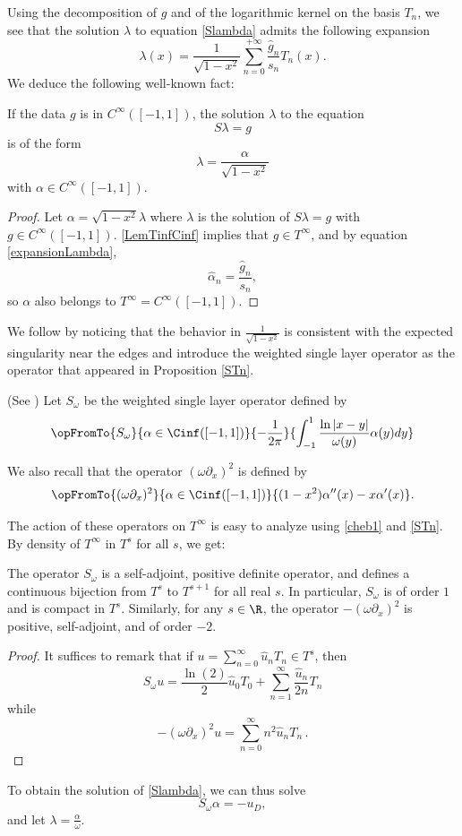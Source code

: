 \documentclass[a4paper]{article}
\begin{document}
	Using the decomposition of $g$ and of the logarithmic kernel on the basis $T_n$, we see that the solution $\lambda$ to equation \eqref{Slambda} admits the following expansion 
	\begin{equation}
	\lambda(x) = \frac{1}{\sqrt{1-x^2}}\sum_{n=0}^{+ \infty} \frac{\hat{g}_n}{s_n} T_n(x).
	\label{expansionLambda}
	\end{equation}
	We deduce the following well-known fact:
	\begin{Cor}
		\label{CorSingularity}
		If the data $g$ is in $C^{\infty}([-1,1])$, the solution $\lambda$ to the equation 
		\[S\lambda = g\]
		is of the form 
		\[\lambda = \dfrac{\alpha}{\sqrt{1-x^2}}\]
		with $\alpha \in C^{\infty}([-1,1])$.  
		\begin{proof}
			Let $\alpha = \sqrt{1 - x^2}\lambda$ where $\lambda$ is the solution of $S\lambda = g$ with $g \in C^{\infty}([-1,1])$. 
			\autoref{LemTinfCinf} implies that $g \in T^{\infty}$, and by equation \eqref{expansionLambda}, 
			\[ \hat{\alpha}_n = \frac{\hat{g}_n}{s_n},\]
			so $\alpha$ also  belongs to $T^{\infty} = C^{\infty}([-1,1])$. 
		\end{proof}
	\end{Cor}
	
	
	We follow \cite{bruno2012second} by noticing that the behavior in $\frac{1}{\sqrt{1-x^2}}$ is consistent with the expected singularity near the edges and introduce the weighted single layer operator as the operator that appeared in Proposition \ref{STn}.
	\begin{Def}(See \cite{bruno2012second}) 
		Let $S_\omega$ be the weighted single layer operator defined by
		\[\opFromTo{S_\omega}{\alpha \in \Cinf([-1,1])}{-\dfrac{1}{2\pi}}{\int_{-1}^1\dfrac{\ln|x-y|}{\omega(y)} \alpha(y)dy}\]
	\end{Def}
	\noindent We also recall that the operator $(\omega\partial_x)^2$ is defined by \[\opFromTo{(\omega\partial_x)^2}{\alpha \in \Cinf([-1,1])}{(1-x^2)\alpha''(x) - x \alpha'(x)}.\]
	
	The action of these operators on $T^{\infty}$ is easy to analyze using \eqref{cheb1} and \autoref{STn}. By density of $T^{\infty}$ in $T^s$ for all $s$, we get:
	\begin{Prop}
		The operator $S_\omega$ is a self-adjoint, positive definite operator, and defines a continuous bijection from $T^{s}$ to $T^{s+1}$ for all real $s$. In particular, $S_\omega$ is of order $1$ and is compact in $T^s$. 
		Similarly, for any $s \in \R$, the operator $-(\omega \partial_x)^2$ is positive, self-adjoint, and of order $-2$. 
	\end{Prop}
	\begin{proof}
		It suffices to remark that if $u=\sum_{n=0}^\infty \hat{u}_n T_n \in T^s$, then
		\[S_\omega u = \frac{\ln(2)}{2} \hat{u}_0 T_0 +  \sum_{n=1}^\infty \frac{\hat{u}_n}{2n} T_n\]
		while
		\[-(\omega \partial_x)^2 u = \sum_{n=0}^\infty n^2\hat{u}_n T_n \,.\]
	\end{proof}
	\noindent To obtain the solution of \eqref{Slambda}, we can thus solve 
	\begin{equation}
	S_\omega \alpha = -u_D,
	\label{Somegaalpha}
	\end{equation}
	and let $\lambda = \frac{\alpha}{\omega}$.  
	
\end{document}
